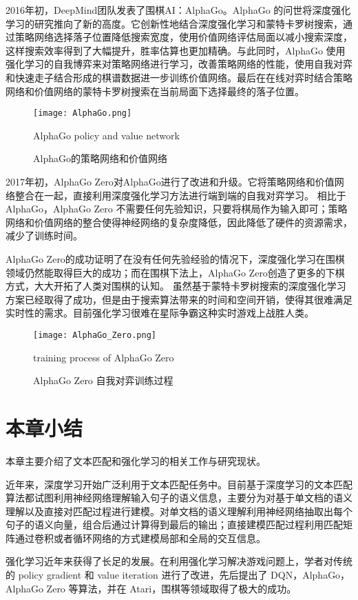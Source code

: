2016年初，DeepMind团队发表了围棋AI：AlphaGo\cite{Silver2016MasteringTG}。AlphaGo 的问世将深度强化学习的研究推向了新的高度。它创新性地结合深度强化学习和蒙特卡罗树搜索，通过策略网络选择落子位置降低搜索宽度，使用价值网络评估局面以减小搜索深度，这样搜索效率得到了大幅提升，胜率估算也更加精确。与此同时，AlphaGo 使用强化学习的自我博弈来对策略网络进行学习，改善策略网络的性能，使用自我对弈和快速走子结合形成的棋谱数据进一步训练价值网络。最后在在线对弈时结合策略网络和价值网络的蒙特卡罗树搜索在当前局面下选择最终的落子位置。

\begin{figure}[!htbp]\centering
  \texttt{[image: AlphaGo.png]}
  \caption{AlphaGo的策略网络和价值网络} {AlphaGo policy and value network}
  \label{fig:AlphaGo}       %
\end{figure}

2017年初，AlphaGo Zero\cite{Silver2017MasteringTG}对AlphaGo进行了改进和升级。它将策略网络和价值网络整合在一起，直接利用深度强化学习方法进行端到端的自我对弈学习。
相比于 AlphaGo，AlphaGo Zero 不需要任何先验知识，只要将棋局作为输入即可；策略网络和价值网络的整合使得神经网络的复杂度降低，因此降低了硬件的资源需求，减少了训练时间。

AlphaGo Zero的成功证明了在没有任何先验经验的情况下，深度强化学习在围棋领域仍然能取得巨大的成功；而在围棋下法上，AlphaGo Zero创造了更多的下棋方式，大大开拓了人类对围棋的认知。
虽然基于蒙特卡罗树搜索的深度强化学习方案已经取得了成功，但是由于搜索算法带来的时间和空间开销，使得其很难满足实时性的需求。目前强化学习很难在星际争霸这种实时游戏上战胜人类。

\begin{figure}[!htbp]\centering
  \texttt{[image: AlphaGo\_Zero.png]}
  \caption{AlphaGo Zero 自我对弈训练过程} {training process of AlphaGo Zero}
  \label{fig:AlphaGo_Zero}       %
\end{figure}

\section{本章小结}

本章主要介绍了文本匹配和强化学习的相关工作与研究现状。

近年来，深度学习开始广泛利用于文本匹配任务中。目前基于深度学习的文本匹配算法都试图利用神经网络理解输入句子的语义信息，主要分为对基于单文档的语义理解以及直接对匹配过程进行建模。对单文档的语义理解利用神经网络抽取出每个句子的语义向量，组合后通过计算得到最后的输出；直接建模匹配过程利用匹配矩阵通过卷积或者循环网络的方式建模局部和全局的交互信息。

强化学习近年来获得了长足的发展。在利用强化学习解决游戏问题上，学者对传统的 policy gradient 和 value iteration 进行了改进，先后提出了 DQN，AlphaGo，AlphaGo Zero 等算法，并在 Atari，围棋等领域取得了极大的成功。
